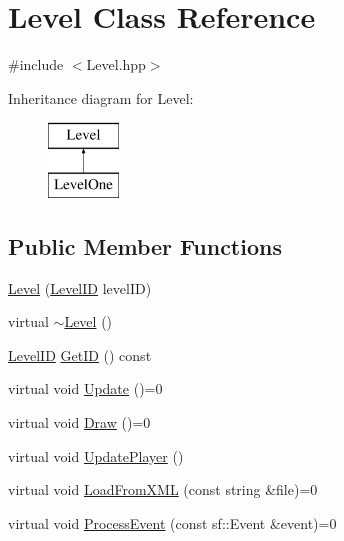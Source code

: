 \hypertarget{class_level}{\section{Level Class Reference}
\label{class_level}
}


{\ttfamily \#include $<$Level.\-hpp$>$}

Inheritance diagram for Level\-:\begin{figure}[H]
\begin{center}
\leavevmode
\includegraphics[height=2.000000cm]{class_level}
\end{center}
\end{figure}
\subsection*{Public Member Functions}
\begin{DoxyCompactItemize}
\item 
\hyperlink{class_level_a638468d7d98ba422bbcaf2e5ea05d421}{Level} (\hyperlink{_level_8hpp_aa0e387304096fe83aba77c85cb7be77a}{Level\-I\-D} level\-I\-D)
\item 
virtual \hyperlink{class_level_a249eac1e8f19ff44134efa5e986feaca}{$\sim$\-Level} ()
\item 
\hyperlink{_level_8hpp_aa0e387304096fe83aba77c85cb7be77a}{Level\-I\-D} \hyperlink{class_level_a03ef47d6709e8b62568cfaad9decfd0e}{Get\-I\-D} () const 
\item 
virtual void \hyperlink{class_level_a540d45e6d0ed7ce481d985881e8e27e2}{Update} ()=0
\item 
virtual void \hyperlink{class_level_a308eb5521217a781d2357ba83d041054}{Draw} ()=0
\item 
virtual void \hyperlink{class_level_a95bbafd05f5aa2396c36ff8343c62a2f}{Update\-Player} ()
\item 
virtual void \hyperlink{class_level_a26a3990bd47120e8e5c59f71d29ccb0a}{Load\-From\-X\-M\-L} (const string \&file)=0
\item 
virtual void \hyperlink{class_level_af8c86b5de9abc37b7f639fd9f5e9ea8e}{Process\-Event} (const sf\-::\-Event \&event)=0
\end{DoxyCompactItemize}
